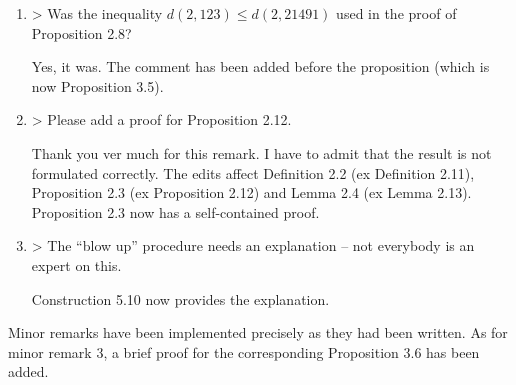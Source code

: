 \documentclass[a4paper,14pt]{article} %
\begin{document}
\begin{enumerate}
	\item

		> Was the inequality $d(2, 123) \leq d(2, 21491)$ used in the proof of Proposition 2.8?

		Yes, it was.
		The comment has been added before the proposition (which is now Proposition 3.5).


	\item

		> Please add a proof for Proposition 2.12.

		Thank you ver much for this remark.
		I have to admit that the result is not formulated correctly.
		The edits affect Definition 2.2 (ex Definition 2.11), Proposition 2.3 (ex Proposition 2.12) and Lemma 2.4 (ex Lemma 2.13).
		Proposition 2.3 now has a self-contained proof.

	\item

		> The “blow up” procedure needs an explanation – not everybody is an expert on this.

		Construction 5.10 now provides the explanation.

\end{enumerate}

Minor remarks have been implemented precisely as they had been written.
As for minor remark 3, a brief proof for the corresponding Proposition 3.6 has been added.







\end{document}

